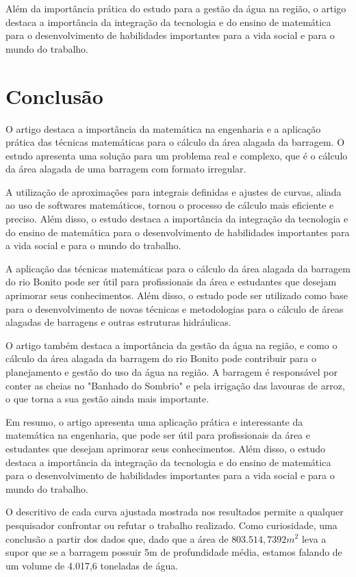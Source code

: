 \documentclass[
	12pt,				%
	openright,			%
	oneside,
	a4paper,			%
	chapter=TITLE,		%
	section=TITLE,		%
	sumario=abnt-6027-2012,
	english,			%
	brazil				%
]{abntex2}
\begin{document}
	Além da importância prática do estudo para a gestão da água na região, o artigo destaca a importância da integração da tecnologia e do ensino de matemática para o desenvolvimento de habilidades importantes para a vida social e para o mundo do trabalho.
	

\chapter{Conclusão}

	O artigo destaca a importância da matemática na engenharia e a aplicação prática das técnicas matemáticas para o cálculo da área alagada da barragem. O estudo apresenta uma solução para um problema real e complexo, que é o cálculo da área alagada de uma barragem com formato irregular. 
	
	A utilização de aproximações para integrais definidas e ajustes de curvas, aliada ao uso de softwares matemáticos, tornou o processo de cálculo mais eficiente e preciso. Além disso, o estudo destaca a importância da integração da tecnologia e do ensino de matemática para o desenvolvimento de habilidades importantes para a vida social e para o mundo do trabalho. 
	
	A aplicação das técnicas matemáticas para o cálculo da área alagada da barragem do rio Bonito pode ser útil para profissionais da área e estudantes que desejam aprimorar seus conhecimentos. Além disso, o estudo pode ser utilizado como base para o desenvolvimento de novas técnicas e metodologias para o cálculo de áreas alagadas de barragens e outras estruturas hidráulicas.
	
	O artigo também destaca a importância da gestão da água na região, e como o cálculo da área alagada da barragem do rio Bonito pode contribuir para o planejamento e gestão do uso da água na região. A barragem é responsável por conter as cheias no "Banhado do Sombrio" e pela irrigação das lavouras de arroz, o que torna a sua gestão ainda mais importante.
	
	Em resumo, o artigo apresenta uma aplicação prática e interessante da matemática na engenharia, que pode ser útil para profissionais da área e estudantes que desejam aprimorar seus conhecimentos. Além disso, o estudo destaca a importância da integração da tecnologia e do ensino de matemática para o desenvolvimento de habilidades importantes para a vida social e para o mundo do trabalho.
	
	O descritivo de cada curva ajustada mostrada nos resultados permite a qualquer pesquisador confrontar ou refutar o trabalho realizado. Como curiosidade, uma conclusão a partir dos dados que, dado que a área de $803.514,7392m^{2}$ leva a supor que se a barragem possuir 5m de profundidade média, estamos falando de um volume de 4.017,6 toneladas de água.
\end{document}
